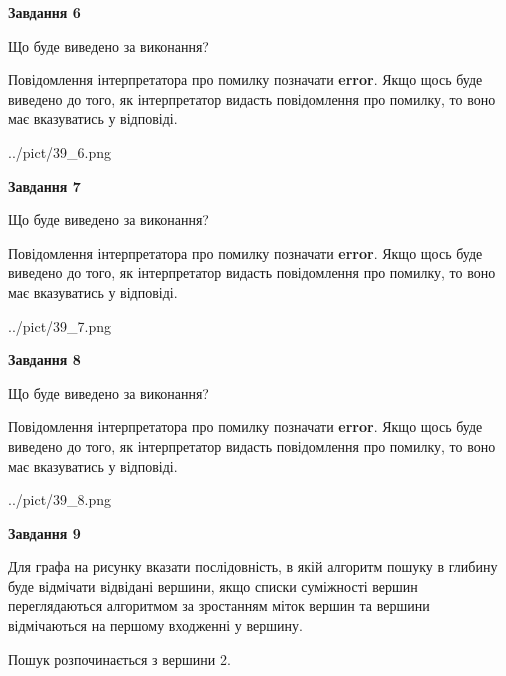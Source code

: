 \documentclass[12pt, ukrainian]{article}
\begin{document}
{\begin {large}
{\begin {center}\textbf{Завдання 6}\end {center}}\par
Що буде виведено за виконання?

Повідомлення інтерпретатора про помилку позначати \textbf{error}.
Якщо щось буде виведено до того, як інтерпретатор видасть повідомлення про помилку, 
то воно має вказуватись у відповіді. \par


\begin{center}
	{../pict/39_6.png}
\end{center}
\newpage

{\begin {center}\textbf{Завдання 7}\end {center}}\par
Що буде виведено за виконання?

Повідомлення інтерпретатора про помилку позначати \textbf{error}.
Якщо щось буде виведено до того, як інтерпретатор видасть повідомлення про помилку, 
то воно має вказуватись у відповіді. \par


\begin{center}
	{../pict/39_7.png}
\end{center}
\newpage

{\begin {center}\textbf{Завдання 8}\end {center}}\par
Що буде виведено за виконання?

Повідомлення інтерпретатора про помилку позначати \textbf{error}.
Якщо щось буде виведено до того, як інтерпретатор видасть повідомлення про помилку, 
то воно має вказуватись у відповіді. \par


\begin{center}
	{../pict/39_8.png}
\end{center}
\newpage

{\begin {center}\textbf{Завдання 9}\end {center}}\par
Для графа на рисунку вказати послідовність, в якій алгоритм пошуку в глибину буде відмічати відвідані вершини, якщо списки суміжності вершин переглядаються алгоритмом за зростанням міток вершин та вершини відмічаються на першому вход\-женні у вершину.\par
Пошук розпочинається з вершини 2.\par


\end{large}}
\end{document}
